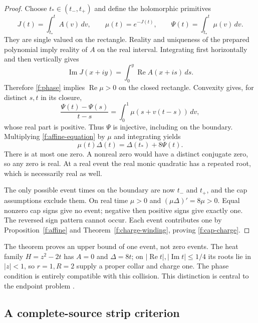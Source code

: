 \begin{proof}
Choose $t_*\in(t_-,t_+)$ and define the holomorphic primitives
\[
 J(t)=\int_{t_*}^t A(v)\,dv,\qquad
 \mu(t)=e^{-J(t)},\qquad \Psi(t)=\int_{t_*}^t\mu(v)\,dv.
\]
They are single valued on the rectangle.  Reality and uniqueness of
the prepared polynomial imply reality of $A$ on the real interval.
Integrating first horizontally and then vertically gives
\[
 \operatorname{Im}J(x+iy)=\int_0^y\operatorname{Re}A(x+is)\,ds.
\]
Therefore \eqref{f:phase} implies $\operatorname{Re}\mu>0$ on the
closed rectangle.  Convexity gives, for distinct $s,t$ in its closure,
\[
 \frac{\Psi(t)-\Psi(s)}{t-s}
      =\int_0^1\mu(s+v(t-s))\,dv,
\]
whose real part is positive.  Thus $\Psi$ is injective, including
on the boundary.  Multiplying \eqref{f:affine-equation} by $\mu$
and integrating yields
\begin{equation}\label{f:normal-form}
                 \mu(t)\Delta(t)=\Delta(t_*)+8\Psi(t).
\end{equation}
There is at most one zero.  A nonreal zero would have a distinct
conjugate zero, so any zero is real.  At a real event the real monic
quadratic has a repeated root, which is necessarily real as well.

The only possible event times on the boundary are now $t_-$ and
$t_+$, and the cap assumptions exclude them.  On real time $\mu>0$
and $(\mu\Delta)'=8\mu>0$.  Equal nonzero cap signs give no event;
negative then positive signs give exactly one.  The reversed sign
pattern cannot occur.  Each event contributes one by
Proposition~\ref{f:affine} and Theorem~\ref{f:charge-winding}, proving
\eqref{f:cap-charge}.
\end{proof}

The theorem proves an upper bound of one event, not zero events.  The
heat family $H=z^2-2t$ has $A=0$ and $\Delta=8t$; on
$|\operatorname{Re}t|,|\operatorname{Im}t|\le1/4$ its roots lie in
$|z|<1$, so $r=1,R=2$ supply a proper collar and charge one.  The
phase condition is entirely compatible with this collision.  This
distinction is central to the endpoint problem \cite{note05}.

\subsection{A complete-source strip criterion}

